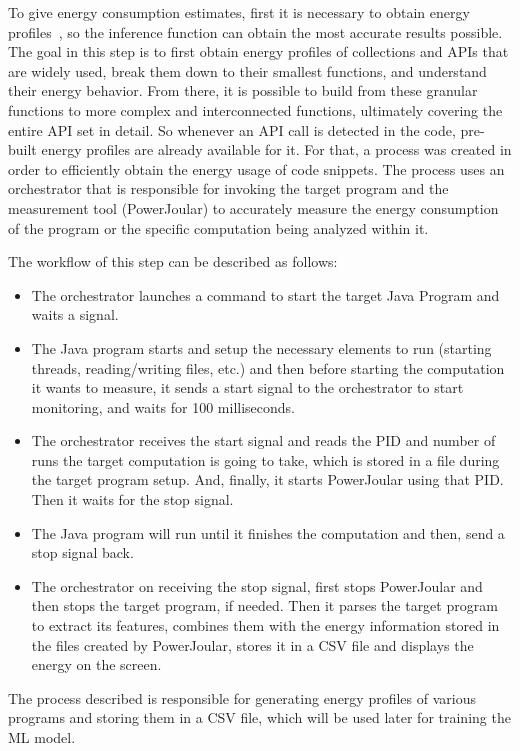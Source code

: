 \documentclass[sigplan]{acmart}
\begin{document}
To give energy consumption estimates, first it is necessary to obtain energy profiles~\cite{10.1145/2884781.2884869,8816747}, so the inference function can obtain the most accurate results possible. The goal in this step is to first obtain energy profiles of collections and APIs that are widely used, break them down to their smallest functions, and understand their energy behavior. From there, it is possible to build from these granular functions to more complex and interconnected functions, ultimately covering the entire API set in detail. So whenever an API call is detected in the code, pre-built energy profiles are already available for it.
For that, a process was created in order to efficiently obtain the energy usage of code snippets.
The process uses an orchestrator that is responsible for invoking the target program and the measurement tool (PowerJoular) to accurately measure the energy consumption of the program or the specific computation being analyzed within it.

The workflow of this step can be described as follows:

\begin{itemize}
  \item The orchestrator launches a command to start the target Java Program and waits a signal.
  \item The Java program starts and setup the necessary elements to run (starting threads, reading/writing files, etc.) and then before starting the computation it wants to measure, it sends a start signal to the orchestrator to start monitoring, and waits for 100 milliseconds.
  \item The orchestrator receives the start signal and reads the PID and number of runs the target computation is going to take, which is stored in a file during the target program setup. And, finally, it starts PowerJoular using that PID. Then it waits for the stop signal.
  \item The Java program will run until it finishes the computation and then, send a stop signal back.
  \item The orchestrator on receiving the stop signal, first stops PowerJoular and then stops the target program, if needed. Then it parses the target program to extract its features, combines them with the energy information stored in the files created by PowerJoular, stores it in a CSV file and displays the energy on the screen.
\end{itemize}

The process described is responsible for generating energy profiles of various programs and storing them in a CSV file, which will be used later for training the ML model.
\end{document}

